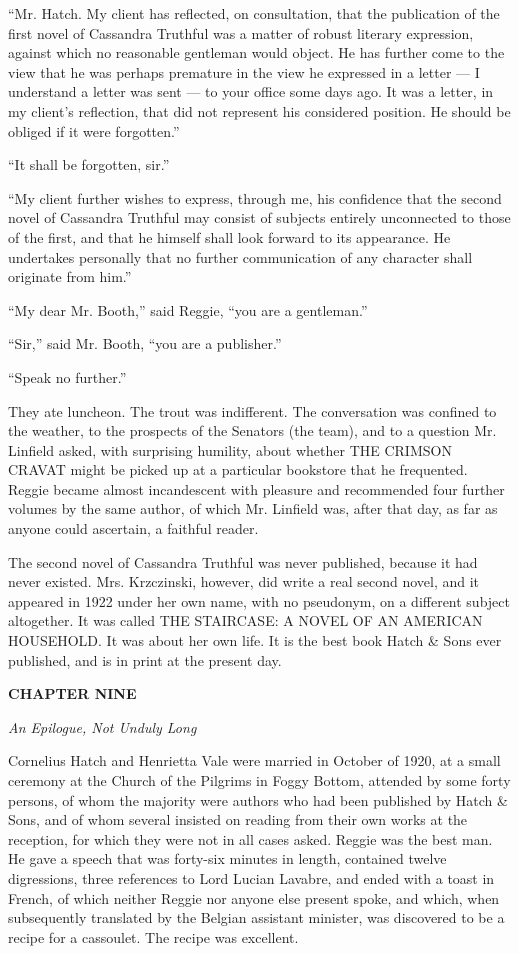 \documentclass[12pt,openright]{book}
\begin{document}
“Mr. Hatch. My client has reflected, on consultation, that the publication of the first novel of Cassandra Truthful was a matter of robust literary expression, against which no reasonable gentleman would object. He has further come to the view that he was perhaps premature in the view he expressed in a letter — I understand a letter was sent — to your office some days ago. It was a letter, in my client’s reflection, that did not represent his considered position. He should be obliged if it were forgotten.”

“It shall be forgotten, sir.”

“My client further wishes to express, through me, his confidence that the second novel of Cassandra Truthful may consist of subjects entirely unconnected to those of the first, and that he himself shall look forward to its appearance. He undertakes personally that no further communication of any character shall originate from him.”

“My dear Mr. Booth,” said Reggie, “you are a gentleman.”

“Sir,” said Mr. Booth, “you are a publisher.”

“Speak no further.”

They ate luncheon. The trout was indifferent. The conversation was confined to the weather, to the prospects of the Senators (the team), and to a question Mr. Linfield asked, with surprising humility, about whether THE CRIMSON CRAVAT might be picked up at a particular bookstore that he frequented. Reggie became almost incandescent with pleasure and recommended four further volumes by the same author, of which Mr. Linfield was, after that day, as far as anyone could ascertain, a faithful reader.

The second novel of Cassandra Truthful was never published, because it had never existed. Mrs. Krzczinski, however, did write a real second novel, and it appeared in 1922 under her own name, with no pseudonym, on a different subject altogether. It was called THE STAIRCASE: A NOVEL OF AN AMERICAN HOUSEHOLD. It was about her own life. It is the best book Hatch \& Sons ever published, and is in print at the present day.

\textbf{CHAPTER NINE}

\textit{An Epilogue, Not Unduly Long}

Cornelius Hatch and Henrietta Vale were married in October of 1920, at a small ceremony at the Church of the Pilgrims in Foggy Bottom, attended by some forty persons, of whom the majority were authors who had been published by Hatch \& Sons, and of whom several insisted on reading from their own works at the reception, for which they were not in all cases asked. Reggie was the best man. He gave a speech that was forty-six minutes in length, contained twelve digressions, three references to Lord Lucian Lavabre, and ended with a toast in French, of which neither Reggie nor anyone else present spoke, and which, when subsequently translated by the Belgian assistant minister, was discovered to be a recipe for a cassoulet. The recipe was excellent.
\end{document}
